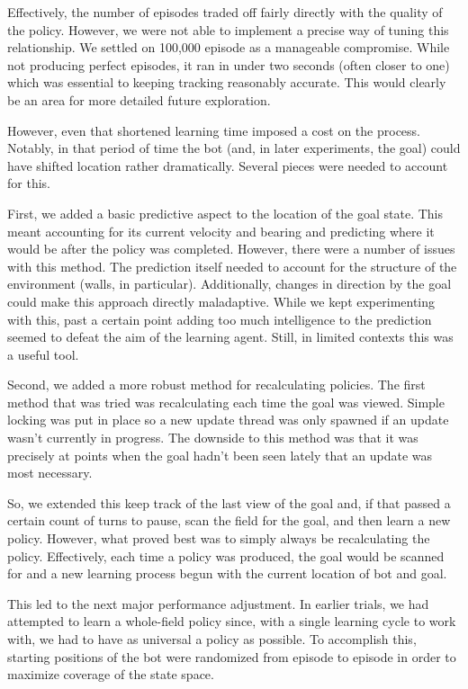 \documentclass{aiaa-tc}%
\begin{document}
Effectively, the number of episodes traded off fairly directly with
the quality of the policy. However, we were not able to implement a
precise way of tuning this relationship. We settled on 100,000 episode as a manageable
compromise. While not producing perfect episodes, it ran in under two
seconds (often closer to one) which was essential to
keeping tracking reasonably accurate. This would clearly be an area
for more detailed future exploration.

However, even that shortened learning time imposed a cost on the process. Notably, in
that period of time the bot (and, in later experiments, the goal)
could have shifted location rather dramatically. Several pieces were
needed to account for this.

First, we added a basic predictive aspect to the location of the goal
state. This meant accounting for its current velocity and bearing and
predicting where it would be after the policy was completed. However,
there were a number of issues with this method. The prediction itself
needed to account for the structure of the environment (walls, in
particular). Additionally, changes in direction by the goal could make
this approach directly maladaptive. While we kept experimenting with
this, past a certain point adding too much intelligence to the
prediction seemed to defeat the aim of the learning agent. Still, in
limited contexts this was a useful tool.

Second, we added a more robust method for recalculating policies. The
first method that was tried was recalculating each time the goal
was viewed. Simple locking was put in place so a new update thread was
only spawned if an update wasn't currently in progress. The downside
to this method was that it was precisely at points when the goal
hadn't been seen lately that an update was most necessary.

So, we extended this keep track of the last view of the goal and, if
that passed a certain count of turns to pause, scan the field for the
goal, and then learn a new policy. However, what proved best was to
simply always be recalculating the policy. Effectively, each time a
policy was produced, the goal would be scanned for and a new learning
process begun with the current location of bot and goal.

This led to the next major performance adjustment. In earlier trials,
we had attempted to learn a whole-field policy since, with a single
learning cycle to work with, we had to have as universal a policy as
possible. To accomplish this, starting positions of the bot were
randomized from episode to episode in order to maximize coverage of
the state space.
\end{document}
